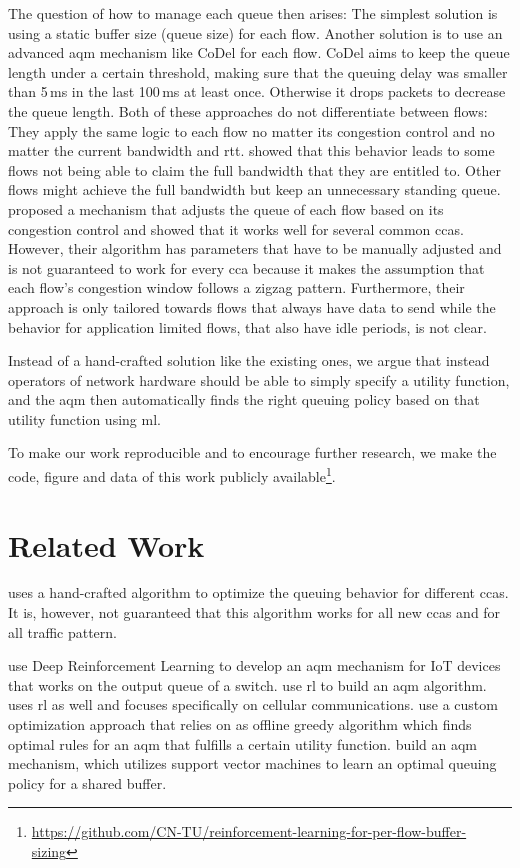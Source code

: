 \documentclass[conference]{IEEEtran}
\begin{document}
The question of how to manage each queue then arises: The simplest solution is using a static buffer size (queue size) for each flow. Another solution is to use an advanced \gls{aqm} mechanism like CoDel for each flow. CoDel aims to keep the queue length under a certain threshold, making sure that the queuing delay was smaller than 5\,ms in the last 100\,ms at least once. Otherwise it drops packets to decrease the queue length. Both of these approaches do not differentiate between flows: They apply the same logic to each flow no matter its congestion control and no matter the current bandwidth and \gls{rtt}. \cite{bachl_cocoa_2019} showed that this behavior leads to some flows not being able to claim the full bandwidth that they are entitled to. Other flows might achieve the full bandwidth but keep an unnecessary standing queue. \cite{bachl_cocoa_2019} proposed a mechanism that adjusts the queue of each flow based on its congestion control and showed that it works well for several common \glspl{cca}. However, their algorithm has parameters that have to be manually adjusted and is not guaranteed to work for every \gls{cca} because it makes the assumption that each flow's congestion window follows a zigzag pattern. Furthermore, their approach is only tailored towards flows that always have data to send while the behavior for application limited flows, that also have idle periods, is not clear. 

Instead of a hand-crafted solution like the existing ones, we argue that instead operators of network hardware should be able to simply specify a utility function, and the \gls{aqm} then automatically finds the right queuing policy based on that utility function using \gls{ml}. 

To make our work reproducible and to encourage further research, we make the code, figure and data of this work publicly available\footnote{\url{https://github.com/CN-TU/reinforcement-learning-for-per-flow-buffer-sizing}}. 

\section{Related Work}

\cite{bachl_cocoa_2019} uses a hand-crafted algorithm to optimize the queuing behavior for different \glspl{cca}. It is, however, not guaranteed that this algorithm works for all new \glspl{cca} and for all traffic pattern. 

\cite{kim_deep_2019} use Deep Reinforcement Learning to develop an \gls{aqm} mechanism for IoT devices that works on the output queue of a switch.  \cite{bouacida_practical_2019,bisoy_design_2017} use \gls{rl} to build an \gls{aqm} algorithm. \cite{vucevic_reinforcement_2007} uses \gls{rl} as well and focuses specifically on cellular communications. \cite{lin_kemy_2015} use a custom optimization approach that relies on as offline greedy algorithm which finds optimal rules for an \gls{aqm} that fulfills a certain utility function. \cite{shah_sam_2016} build an \gls{aqm} mechanism, which utilizes support vector machines to learn an optimal queuing policy for a shared buffer. 
\end{document}

